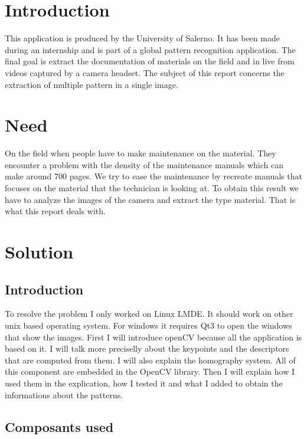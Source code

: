 \documentclass[english,a4paper,11pt]{report}
\begin{document}
	\tableofcontents
	\newpage
	
	
	\chapter{Introduction}
		This application is produced by the University of Salerno. It has been made during an internship and is part of a global pattern recognition application. The final goal is extract the documentation of materials on the field and in live from videos captured by a camera headset. The subject of this report concerns the extraction of multiple pattern in a single image.
	
	\chapter{Need}
		On the field when people have to make maintenance on the material. They encounter a problem with the density of the maintenance manuals which can make around 700 pages. We try to ease the maintenance by recreate manuals that focuses on the material that the technician is looking at. To obtain this result we have to analyze the images of the camera and extract the type material. That is what this report deals with.
	
		
	\chapter{Solution}
	\section{Introduction}
	\par To resolve the problem I only worked on Linux LMDE. It should work on other unix based operating system. For windows it requires Qt3 to open the windows that show the images.
	First I will introduce openCV because all the application is based on it. I will talk more preciselly about the keypoints and the descriptors that are computed from them. I will also explain the homography system. All of this component are embedded in the OpenCV library.
	Then I will explain how I used them in the explication, how I tested it and what I added to obtain the informations about the patterns.
	
	\section{Composants used}
	
\end{document}
